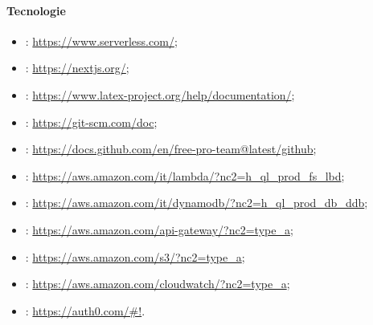 \paragraph{Tecnologie}
\begin{itemize}
    \item \textbf{}: \url{https://www.serverless.com/};
    \item \textbf{}: \url{https://nextjs.org/};
    \item \textbf{}: \url{https://www.latex-project.org/help/documentation/};
    \item \textbf{}: \url{https://git-scm.com/doc};
    \item \textbf{}: \url{https://docs.github.com/en/free-pro-team@latest/github};
    \item \textbf{}: \url{https://aws.amazon.com/it/lambda/?nc2=h_ql_prod_fs_lbd};
    \item \textbf{}: \url{https://aws.amazon.com/it/dynamodb/?nc2=h_ql_prod_db_ddb};
    \item \textbf{}: \url{https://aws.amazon.com/api-gateway/?nc2=type_a};
    \item \textbf{}: \url{https://aws.amazon.com/s3/?nc2=type_a};
    \item \textbf{}: \url{https://aws.amazon.com/cloudwatch/?nc2=type_a};
    \item \textbf{}: \url{https://auth0.com/#!}.
\end{itemize}